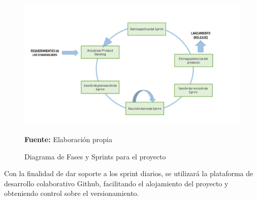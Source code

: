 \begin{figure}[H]
    \centering    \includegraphics[width=1\textwidth]{Anexos/LATEX/chapters/images/Scrum_1.jpg}
    \caption{Diagrama de Fases y Sprints para el proyecto}
    \small{\textbf{Fuente:} Elaboración propia}
    \label{SCRUM2}
\end{figure}

Con la finalidad de dar soporte a los sprint diarios, se utilizará la plataforma de desarrollo colaborativo Github, facilitando el alojamiento del proyecto y obteniendo control sobre el versionamiento.






